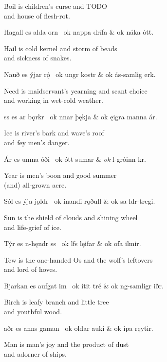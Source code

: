 \bvb Boil is children’s curse and TODO \\
and house of flesh-rot.\evb\evg


\bvg\bva Hagall es alda orn \hld\ ok nappa drífa &
\ind ok náka ótt.\eva

\bvb Hail is cold kernel and storm of beads \\
and sickness of snakes.\evb\evg


\bvg\bva Nauð es ýjar rǫ́ \hld\ ok ungr kostr &
\ind ok ás-samlig erk.\eva

\bvb Need is maidservant’s yearning and scant choice \\
and working in wet-cold weather.\evb\evg


\bvg\bva {}ss es ar bǫrkr \hld\ ok nnar þękja &
\ind ok ęigra manna ár.\eva

\bvb Ice is river’s bark and wave’s roof \\
and fey men’s danger.\evb\evg


\bvg\bva Ár es umna óði \hld\ ok ótt sumar &
\ind \emph{ok} l-gróinn kr.\eva

\bvb Year is men’s boon and good summer \\
(and) all-grown acre.\evb\evg


\bvg\bva Sól es ýja jǫldr \hld\ ok ínandi rǫðull &
\ind ok sa ldr-tregi.\eva

\bvb Sun is the shield of clouds and shining wheel \\
and life-grief of ice.\evb\evg


\bvg\bva Týr es n-hęndr ss \hld\ ok lfs lęifar &
\ind ok ofa ilmir.\eva

\bvb Tew is the one-handed Os and the wolf’s leftovers \\
and lord of hoves.\evb\evg


\bvg\bva Bjarkan es aufgat im \hld\ ok ítit tré &
\ind ok ng-samligr iðr.\eva

\bvb Birch is leafy branch and little tree \\
and youthful wood.\evb\evg


\bvg\bva {}aðr es anns gaman \hld\ ok oldar auki &
\ind ok ipa ręytir.\eva

\bvb Man is man’s joy and the product of dust \\
and adorner of ships.\evb\evg


